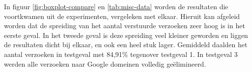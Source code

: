 In figuur \ref{fig:boxplot-compare} en \ref{tab:misc-data} worden de resultaten die voortkwamen uit de experimenten, vergeleken met elkaar. Hieruit kan afgeleid worden dat de spreiding van het aantal verstuurde verzoeken zeer hoog is in het eerste geval. In het tweede geval is deze spreiding veel kleiner geworden en liggen de resultaten dicht bij elkaar, en ook een heel stuk lager. Gemiddeld daalden het aantal verzoeken in testgeval met 84,91\% tegenover testgeval 1. In testgeval 3 werden alle verzoeken naar Google domeinen volledig geëlimineerd.
